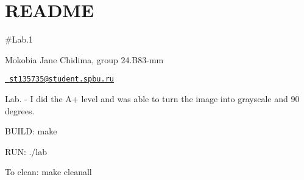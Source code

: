 \chapter{README}
\hypertarget{md_README}{}\label{md_README}
\#\+Lab.1

Mokobia Jane Chidima, group 24.\+B83-\/mm

\href{mailto:st135735@student.spbu.ru}{\texttt{ st135735@student.\+spbu.\+ru}}

Lab. -\/ I did the A+ level and was able to turn the image into grayscale and 90 degrees. ~\newline


BUILD\+: make

RUN\+: ./lab

To clean\+: make cleanall 
